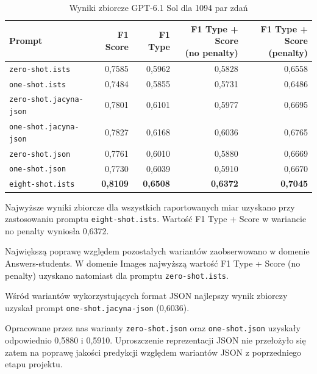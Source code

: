 \documentclass[a4paper,10pt]{article}
\begin{document}
\begin{table}[htbp]
    \centering
    \small
    \caption{Wyniki zbiorcze GPT-6.1 Sol dla 1094 par zdań}
    \label{tab:sol_pooled}
    \begin{tabular}{lrrrr}
        \toprule
        Prompt
        & F1 Score
        & F1 Type
        & \shortstack{F1 Type + Score\\(no penalty)}
        & \shortstack{F1 Type + Score\\(penalty)} \\
        \midrule
        \texttt{zero-shot.ists}
            & 0,7585 & 0,5962 & 0,5828 & 0,6558 \\
        \texttt{one-shot.ists}
            & 0,7484 & 0,5855 & 0,5731 & 0,6486 \\
        \texttt{zero-shot.jacyna-json}
            & 0,7801 & 0,6101 & 0,5977 & 0,6695 \\
        \texttt{one-shot.jacyna-json}
            & 0,7827 & 0,6168 & 0,6036 & 0,6765 \\
        \texttt{zero-shot.json}
            & 0,7761 & 0,6010 & 0,5880 & 0,6669 \\
        \texttt{one-shot.json}
            & 0,7730 & 0,6039 & 0,5910 & 0,6670 \\
        \texttt{eight-shot.ists}
            & \textbf{0,8109}
            & \textbf{0,6508}
            & \textbf{0,6372}
            & \textbf{0,7045} \\
        \bottomrule
    \end{tabular}
\end{table}

Najwyższe wyniki zbiorcze dla wszystkich raportowanych
miar uzyskano przy zastosowaniu promptu
\texttt{eight-shot.ists}. Wartość F1 Type + Score
w wariancie no penalty wyniosła 0,6372.

Największą poprawę względem pozostałych wariantów
zaobserwowano w domenie Answers-students. W domenie
Images najwyższą wartość F1 Type + Score
(no penalty) uzyskano natomiast dla promptu
\texttt{zero-shot.ists}.

Wśród wariantów wykorzystujących format JSON najlepszy
wynik zbiorczy uzyskał prompt
\texttt{one-shot.jacyna-json} (0,6036).

Opracowane przez nas warianty \texttt{zero-shot.json}
oraz \texttt{one-shot.json} uzyskały odpowiednio
0,5880 i 0,5910. Uproszczenie reprezentacji JSON
nie przełożyło się zatem na poprawę jakości predykcji
względem wariantów JSON z poprzedniego etapu projektu.
\end{document}
